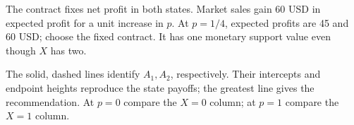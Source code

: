 The contract fixes net profit in both states. Market sales gain 60 USD in expected profit for a unit increase in $p$. At $p=1/4$, expected profits are 45 and 60 USD; choose the fixed contract. It has one monetary support value even though $X$ has two.
\begin{center}\end{center}
The solid, dashed lines identify $A_1,A_2$, respectively. Their intercepts and endpoint heights reproduce the state payoffs; the greatest line gives the recommendation. At $p=0$ compare the $X=0$ column; at $p=1$ compare the $X=1$ column.
\clearpage
